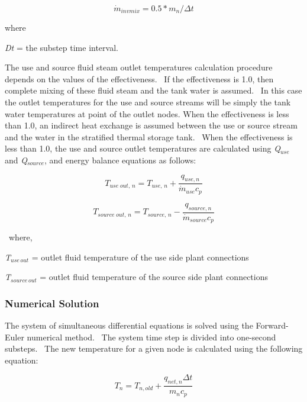 \begin{equation}
{\dot m_{invmix}} = 0.5*{m_n}/\Delta t
\end{equation}

where

\emph{Dt} = the substep time interval.

The use and source fluid steam outlet temperatures calculation procedure depends on the values of the effectiveness.~ If the effectiveness is 1.0, then complete mixing of these fluid steam and the tank water is assumed.~ In this case the outlet temperatures for the use and source streams will be simply the tank water temperatures at point of the outlet nodes. When the effectiveness is less than 1.0, an indirect heat exchange is assumed between the use or source stream and the water in the stratified thermal storage tank.~ When the effectiveness is less than 1.0, the use and source outlet temperatures are calculated using \emph{Q\(_{use}\)} and \emph{Q\(_{source}\)}, and energy balance equations as follows:

\begin{equation}
{T_{use\;out,\,n}} = {T_{use,\,n}} + \frac{{{q_{use,n}}}}{{{{\dot m}_{use}}{c_p}}}
\end{equation}

\begin{equation}
{T_{source\;out,\,n}} = {T_{source,\,n}} - \frac{{{q_{source,n}}}}{{{{\dot m}_{source}}{c_p}}}
\end{equation}

~where,

\emph{T\(_{use\, out}\)} = outlet fluid temperature of the use side plant connections

\emph{T\(_{source\, out}\)} = outlet fluid temperature of the source side plant connections

\subsubsection{Numerical Solution}\label{numerical-solution}

The system of simultaneous differential equations is solved using the Forward-Euler numerical method.~ The system time step is divided into one-second substeps.~ The new temperature for a given node is calculated using the following equation:

\begin{equation}
{T_n} = {T_{n,old}} + \frac{{{q_{net,n}}\Delta t}}{{{m_n}{c_p}}}
\end{equation}

